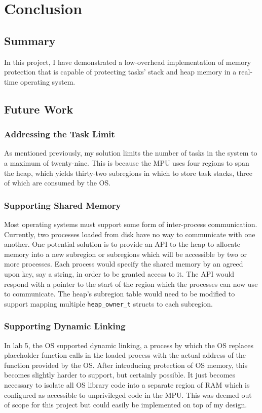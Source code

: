 
\chapter{Conclusion}

\section{Summary}

In this project, I have demonstrated a low-overhead implementation of memory protection that is capable of protecting tasks' stack and heap memory in a real-time operating system.

\section{Future Work}

\subsection{Addressing the Task Limit}

As mentioned previously, my solution limits the number of tasks in the system to a maximum of twenty-nine. This is because the MPU uses four regions to span the heap, which yields thirty-two subregions in which to store task stacks, three of which are consumed by the OS.

\subsection{Supporting Shared Memory}

Most operating systems must support some form of inter-process communication. Currently, two processes loaded from disk have no way to communicate with one another. One potential solution is to provide an API to the heap to allocate memory into a new subregion or subregions which will be accessible by two or more processes. Each process would specify the shared memory by an agreed upon key, say a string, in order to be granted access to it. The API would respond with a pointer to the start of the region which the processes can now use to communicate. The heap's subregion table would need to be modified to support mapping multiple \texttt{heap\_owner\_t} structs to each subregion.

\subsection{Supporting Dynamic Linking}

In lab 5, the OS supported dynamic linking, a process by which the OS replaces placeholder function calls in the loaded process with the actual address of the function provided by the OS. After introducing protection of OS memory, this becomes slightly harder to support, but certainly possible. It just becomes necessary to isolate all OS library code into a separate region of RAM which is configured as accessible to unprivileged code in the MPU. This was deemed out of scope for this project but could easily be implemented on top of my design.

